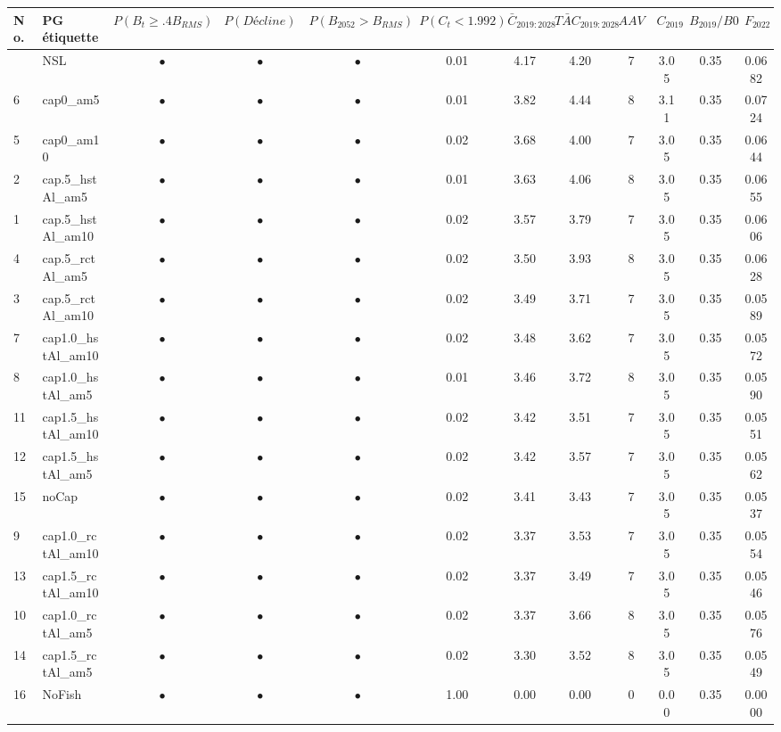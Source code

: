 \documentclass[11pt]{book}
\begin{document}
\begin{landscape}
\begin{longtable}[t]{llcccccccccc}
\textbf{No.} & \textbf{PG étiquette} & \textbf{$P(B_t \geq .4B_{RMS})$} & \textbf{$P(Décline)$} & \textbf{$P(B_{2052} > B_{RMS})$} & \textbf{$P(C_t < 1.992)$} & \textbf{$\bar{C}_{2019:2028}$} & \textbf{$\bar{TAC}_{2019:2028}$} & \textbf{$AAV$} & \textbf{$C_{2019}$} & \textbf{$B_{2019}/B0$} & \textbf{$F_{2022}$}\\
\midrule
\endhead
\
\endfoot
\bottomrule
\endlastfoot
17 & NSL & $\bullet$ & $\bullet$ & $\bullet$ & 0.01 & 4.17 & 4.20 & 7 & 3.05 & 0.35 & 0.0682\\
6 & cap0\_am5 & $\bullet$ & $\bullet$ & $\bullet$ & 0.01 & 3.82 & 4.44 & 8 & 3.11 & 0.35 & 0.0724\\
5 & cap0\_am10 & $\bullet$ & $\bullet$ & $\bullet$ & 0.02 & 3.68 & 4.00 & 7 & 3.05 & 0.35 & 0.0644\\
2 & cap.5\_hstAl\_am5 & $\bullet$ & $\bullet$ & $\bullet$ & 0.01 & 3.63 & 4.06 & 8 & 3.05 & 0.35 & 0.0655\\
1 & cap.5\_hstAl\_am10 & $\bullet$ & $\bullet$ & $\bullet$ & 0.02 & 3.57 & 3.79 & 7 & 3.05 & 0.35 & 0.0606\\
4 & cap.5\_rctAl\_am5 & $\bullet$ & $\bullet$ & $\bullet$ & 0.02 & 3.50 & 3.93 & 8 & 3.05 & 0.35 & 0.0628\\
3 & cap.5\_rctAl\_am10 & $\bullet$ & $\bullet$ & $\bullet$ & 0.02 & 3.49 & 3.71 & 7 & 3.05 & 0.35 & 0.0589\\
7 & cap1.0\_hstAl\_am10 & $\bullet$ & $\bullet$ & $\bullet$ & 0.02 & 3.48 & 3.62 & 7 & 3.05 & 0.35 & 0.0572\\
8 & cap1.0\_hstAl\_am5 & $\bullet$ & $\bullet$ & $\bullet$ & 0.01 & 3.46 & 3.72 & 8 & 3.05 & 0.35 & 0.0590\\
11 & cap1.5\_hstAl\_am10 & $\bullet$ & $\bullet$ & $\bullet$ & 0.02 & 3.42 & 3.51 & 7 & 3.05 & 0.35 & 0.0551\\
12 & cap1.5\_hstAl\_am5 & $\bullet$ & $\bullet$ & $\bullet$ & 0.02 & 3.42 & 3.57 & 7 & 3.05 & 0.35 & 0.0562\\
15 & noCap & $\bullet$ & $\bullet$ & $\bullet$ & 0.02 & 3.41 & 3.43 & 7 & 3.05 & 0.35 & 0.0537\\
9 & cap1.0\_rctAl\_am10 & $\bullet$ & $\bullet$ & $\bullet$ & 0.02 & 3.37 & 3.53 & 7 & 3.05 & 0.35 & 0.0554\\
13 & cap1.5\_rctAl\_am10 & $\bullet$ & $\bullet$ & $\bullet$ & 0.02 & 3.37 & 3.49 & 7 & 3.05 & 0.35 & 0.0546\\
10 & cap1.0\_rctAl\_am5 & $\bullet$ & $\bullet$ & $\bullet$ & 0.02 & 3.37 & 3.66 & 8 & 3.05 & 0.35 & 0.0576\\
14 & cap1.5\_rctAl\_am5 & $\bullet$ & $\bullet$ & $\bullet$ & 0.02 & 3.30 & 3.52 & 8 & 3.05 & 0.35 & 0.0549\\
16 & NoFish & $\bullet$ & $\bullet$ & $\bullet$ & 1.00 & 0.00 & 0.00 & 0 & 0.00 & 0.35 & 0.0000\\*
\end{longtable}
\endgroup{}
\end{landscape}
\endgroup{}
\end{document}
